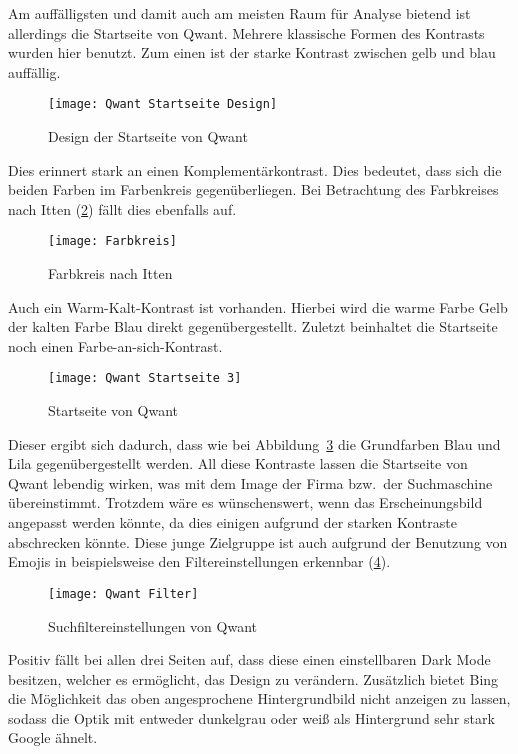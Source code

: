 Am auffälligsten und damit auch am meisten Raum für Analyse bietend ist allerdings die Startseite von Qwant. Mehrere
klassische Formen des Kontrasts wurden hier benutzt.
Zum einen ist der starke Kontrast zwischen gelb und blau auffällig.
\begin{figure}[ht]
    \centering
    \texttt{[image: Qwant Startseite Design]}
    \caption{Design der Startseite von Qwant}\label{fig:figure6}
\end{figure}
Dies erinnert stark an einen Komplementärkontrast.
Dies bedeutet, dass sich die beiden Farben im Farbenkreis gegenüberliegen\autocite[Seite 33]{Maulhardt.20220513}.
Bei Betrachtung des Farbkreises nach Itten (\ref{fig:farbkreis}) fällt dies ebenfalls auf.
\begin{figure}[ht]
    \centering
    \texttt{[image: Farbkreis]}
    \caption{Farbkreis nach Itten\autocite{Farbkreis}}
    \label{fig:farbkreis}
\end{figure}
Auch ein Warm-Kalt-Kontrast ist vorhanden.
Hierbei wird die warme Farbe Gelb der kalten Farbe Blau direkt gegenübergestellt\autocite[Seite 34]{Maulhardt.20220513}.
Zuletzt beinhaltet die Startseite noch einen Farbe-an-sich-Kontrast.
\begin{figure}[ht]
    \centering
    \texttt{[image: Qwant Startseite 3]}
    \caption{Startseite von Qwant}
    \label{fig:qwantstartseite3}
\end{figure}
Dieser ergibt sich dadurch,
dass wie bei Abbildung~\ref{fig:qwantstartseite3} die Grundfarben Blau und Lila gegenübergestellt werden\autocite[Seite 38]{Maulhardt.20220513}.
All diese Kontraste lassen die Startseite von Qwant lebendig wirken, was mit dem Image der Firma bzw.\ der Suchmaschine übereinstimmt.
Trotzdem wäre es wünschenswert, wenn das Erscheinungsbild angepasst werden könnte, da dies einigen aufgrund der starken
Kontraste abschrecken könnte.
Diese junge Zielgruppe ist auch aufgrund der Benutzung von Emojis in beispielsweise den
Filtereinstellungen erkennbar (\ref{fig:qwantfilter}).
\begin{figure}[h]
    \centering
    \texttt{[image: Qwant Filter]}
    \caption{Suchfiltereinstellungen von Qwant}
    \label{fig:qwantfilter}
\end{figure}

Positiv fällt bei allen drei Seiten auf, dass diese einen einstellbaren Dark Mode besitzen, welcher es ermöglicht, das Design zu verändern.
Zusätzlich bietet Bing die Möglichkeit das oben angesprochene Hintergrundbild nicht anzeigen zu lassen,
sodass die Optik mit entweder dunkelgrau oder weiß als Hintergrund sehr stark Google ähnelt.

